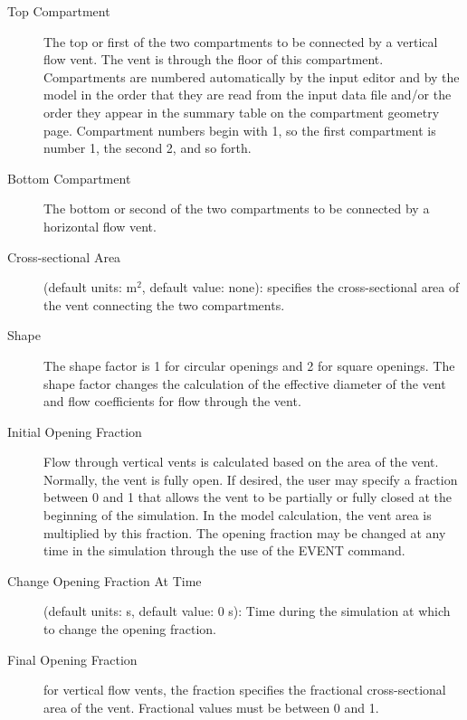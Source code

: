\begin{description}
\item[Top Compartment] The top or first of the two compartments to be connected by a vertical flow vent. The vent is through the floor of this compartment.  Compartments are numbered automatically by the input editor and by the model in the order that they are read from the input data file and/or the order they appear in the summary table on the compartment geometry page. Compartment numbers begin with 1, so the first compartment is number 1, the second 2, and so forth.

\item[Bottom Compartment] The bottom or second of the two compartments to be connected by a horizontal flow vent. 

\item[Cross-sectional Area] (default units: m$^2$, default value: none): specifies the cross-sectional area of the vent connecting the two compartments.

\item[Shape] The shape factor is 1 for circular openings and 2 for square openings. The shape factor changes the calculation of the effective diameter of the vent and flow coefficients for flow through the vent.

\item[Initial Opening Fraction] Flow through vertical vents is calculated based on the area of the vent.  Normally, the vent is fully open.  If desired, the user may specify a fraction between 0 and 1 that allows the vent to be partially or fully closed at the beginning of the simulation.  In the model calculation, the vent area is multiplied by this fraction.  The opening fraction may be changed at any time in the simulation through the use of the EVENT command.

\item[Change Opening Fraction At Time] (default units: s, default value: 0 s): Time during the simulation at which to change the opening fraction.

\item[Final Opening Fraction] for vertical flow vents, the fraction specifies the fractional cross-sectional area of the vent. Fractional values must be between 0 and 1.
\end{description}

